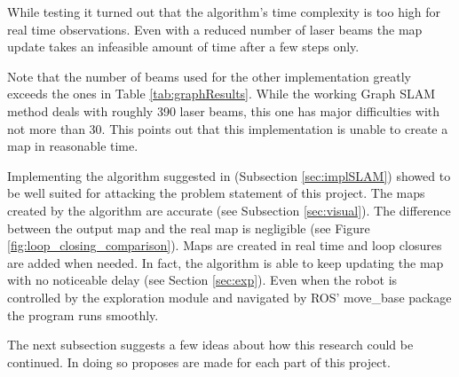 \documentclass{ba-kecs}
\begin{document}
While testing it turned out that the algorithm's time complexity is too high for real time observations. Even with a reduced number of laser beams the map update takes an infeasible amount of time after a few steps only. 
\begin{table}[h]
\begin{center}
\end{center}
\caption{The time the Graph SLAM implementation proposed by \citep{Thrun} needed using the specified number of laser beams after the specified number of steps}
\label{tab:graphResults}
\end{table}
Note that the number of beams used for the other implementation greatly exceeds the ones in Table \ref{tab:graphResults}. While the working Graph SLAM method deals with roughly 390 laser beams, this one has major difficulties with not more than 30.
This points out that this implementation is unable to create a map in reasonable time.

Implementing the algorithm suggested in \citep{Grisetti} (Subsection \ref{sec:implSLAM}) showed to be well suited for attacking the problem statement of this project. The maps created by the algorithm are accurate (see Subsection \ref{sec:visual}). The difference between the output map and the real map is negligible (see Figure \ref{fig:loop_closing_comparison}). Maps are created in real time and loop closures are added when needed. In fact, the algorithm is able to keep updating the map with no noticeable delay (see Section \ref{sec:exp}). Even when the robot is controlled by the exploration module and navigated by ROS' move\_base package the program runs smoothly.

The next subsection suggests a few ideas about how this research could be continued. In doing so proposes are made for each part of this project.
\end{document}
